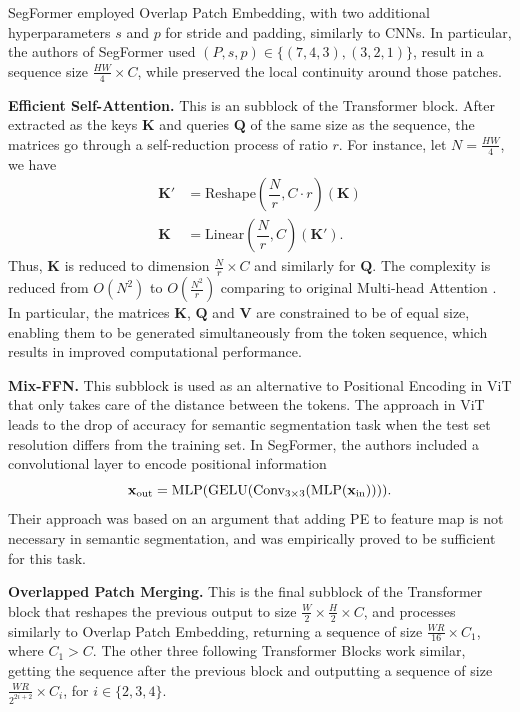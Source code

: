 SegFormer employed Overlap Patch Embedding, with two additional hyperparameters $s$ and $p$ for stride and padding, similarly to CNNs. In particular, the authors of SegFormer used $(P,s,p)\in\{(7,4,3), (3,2,1)\}$, result in a sequence size $\frac{HW}{4} \times C$, while preserved the local continuity around those patches.

\textbf{Efficient Self-Attention.} This is an subblock of the Transformer block. After extracted as the keys $\mathbf{K}$ and queries $\mathbf{Q}$ of the same size as the sequence, the matrices go through a self-reduction process of ratio $r$. For instance, let $N=\frac{HW}{4}$, we have
\begin{align*}
  \mathbf{K'} & = \mathrm{Reshape}\left(\dfrac{N}{r}, C\cdot r\right)(\mathbf{K}) \\
  \mathbf{K}  & = \mathrm{Linear}\left(\dfrac{N}{r}, C\right)(\mathbf{K'}).
\end{align*}
Thus, $\mathbf{K}$ is reduced to dimension $\frac{N}{r}\times C$ and similarly for $\mathbf{Q}$. The complexity is reduced from $O(N^2)$ to $O\left(\frac{N^2}{r}\right)$ comparing to original Multi-head Attention \cite{xie2021segformer}. In particular, the matrices $\mathbf{K}$, $\mathbf{Q}$ and $\mathbf{V}$ are constrained to be of equal size, enabling them to be generated simultaneously from the token sequence, which results in improved computational performance.

\textbf{Mix-FFN.} This subblock is used as an alternative to Positional Encoding in ViT that only takes care of the distance between the tokens. The approach in ViT leads to the drop of accuracy for semantic segmentation task when the test set resolution differs from the training set. In SegFormer, the authors included a convolutional layer to encode positional information
$$\mathbf{x}_{\mathrm{out}} = \mathrm{MLP}(\mathrm{GELU}(\mathrm{Conv_{3\times 3}(\mathrm{MLP}(\mathbf{x}_{in}))})).$$
Their approach was based on an argument that adding PE to feature map is not necessary in semantic segmentation, and was empirically proved to be sufficient for this task.


\textbf{Overlapped Patch Merging.} This is the final subblock of the Transformer block that reshapes the previous output to size $\frac{W}{2}\times \frac{H}{2} \times C$, and processes similarly to Overlap Patch Embedding, returning a sequence of size $\frac{WR}{16}\times C_1$, where $C_1>C$. The other three following Transformer Blocks work similar, getting the sequence after the previous block and outputting a sequence of size $\frac{WR}{2^{2i+2}}\times C_i$, for $i\in\{2,3,4\}$.

